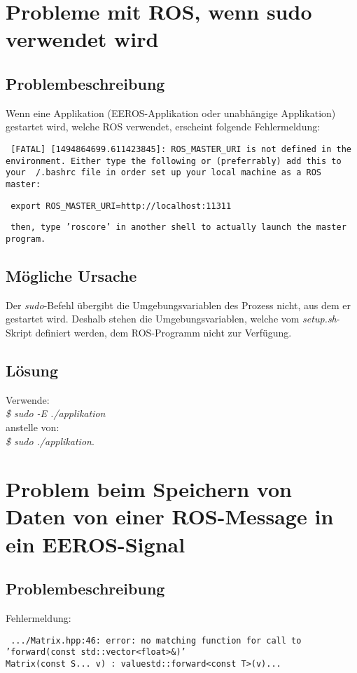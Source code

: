 \section{Probleme mit ROS, wenn sudo verwendet wird}
\subsection{Problembeschreibung}
Wenn eine Applikation (EEROS-Applikation oder unabhängige Applikation) gestartet wird, welche ROS verwendet, erscheint folgende Fehlermeldung:


\texttt{
[FATAL] [1494864699.611423845]: ROS\_MASTER\_URI is not defined in the environment. Either type the following or (preferrably) add this to your ~/.bashrc file in order set up your local machine as a ROS master:
}

\texttt{
export ROS\_MASTER\_URI=http://localhost:11311
}

\texttt{
then, type 'roscore' in another shell to actually launch the master program.
}

\subsection{Mögliche Ursache}
Der \textit{sudo}-Befehl übergibt die Umgebungsvariablen des Prozess nicht, aus dem er gestartet wird.
Deshalb stehen die Umgebungsvariablen, welche vom \textit{setup.sh}-Skript definiert werden, dem ROS-Programm nicht zur Verfügung.

\subsection{Lösung}
Verwende: \\
\textit{\$ sudo -E ./applikation} \\
anstelle von: \\
\textit{\$ sudo ./applikation}.



\section{Problem beim Speichern von Daten von einer ROS-Message in ein EEROS-Signal}

\subsection{Problembeschreibung}
Fehlermeldung:

\texttt{
.../Matrix.hpp:46: error: no matching function for call to \\
'forward(const std::vector<float>\&)' \\
\-\hspace{2cm} Matrix(const S... v) : value{std::forward<const T>(v)...} 
}

